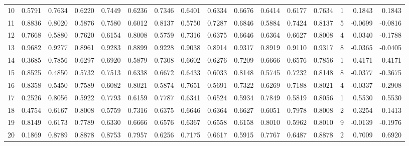 \begin{tabular}{lrrrrrrrrrrrrrrr}
10  &      0.5791 &  0.7634 &  0.6220 &  0.7449 &  0.6236 &  0.7346 &  0.6401 &  0.6334 &  0.6676 &  0.6414 &   0.6177 &     0.7634 &      1 &                    0.1843 &                     0.1843 \\
11  &      0.8836 &  0.8020 &  0.5876 &  0.7580 &  0.6012 &  0.8137 &  0.5750 &  0.7287 &  0.6846 &  0.5884 &   0.7424 &     0.8137 &      5 &                   -0.0699 &                    -0.0816 \\
12  &      0.7668 &  0.5880 &  0.7620 &  0.6154 &  0.8008 &  0.5759 &  0.7316 &  0.6375 &  0.6646 &  0.6364 &   0.6627 &     0.8008 &      4 &                    0.0340 &                    -0.1788 \\
13  &      0.9682 &  0.9277 &  0.8961 &  0.9283 &  0.8899 &  0.9228 &  0.9038 &  0.8914 &  0.9317 &  0.8919 &   0.9110 &     0.9317 &      8 &                   -0.0365 &                    -0.0405 \\
14  &      0.3685 &  0.7856 &  0.6297 &  0.6920 &  0.5879 &  0.7308 &  0.6602 &  0.6276 &  0.7209 &  0.6666 &   0.6576 &     0.7856 &      1 &                    0.4171 &                     0.4171 \\
15  &      0.8525 &  0.4850 &  0.5732 &  0.7513 &  0.6338 &  0.6672 &  0.6433 &  0.6033 &  0.8148 &  0.5745 &   0.7232 &     0.8148 &      8 &                   -0.0377 &                    -0.3675 \\
16  &      0.8358 &  0.5450 &  0.7589 &  0.6082 &  0.8021 &  0.5874 &  0.7651 &  0.5691 &  0.7322 &  0.6269 &   0.7188 &     0.8021 &      4 &                   -0.0337 &                    -0.2908 \\
17  &      0.2526 &  0.8056 &  0.5922 &  0.7793 &  0.6159 &  0.7787 &  0.6341 &  0.6524 &  0.5934 &  0.7849 &   0.5819 &     0.8056 &      1 &                    0.5530 &                     0.5530 \\
18  &      0.4754 &  0.6167 &  0.8008 &  0.5759 &  0.7316 &  0.6375 &  0.6646 &  0.6364 &  0.6627 &  0.6051 &   0.7978 &     0.8008 &      2 &                    0.3254 &                     0.1413 \\
19  &      0.8149 &  0.6173 &  0.7789 &  0.6330 &  0.6666 &  0.6576 &  0.6367 &  0.6558 &  0.6158 &  0.8010 &   0.5962 &     0.8010 &      9 &                   -0.0139 &                    -0.1976 \\
20  &      0.1869 &  0.8789 &  0.8878 &  0.8753 &  0.7957 &  0.6256 &  0.7175 &  0.6617 &  0.5915 &  0.7767 &   0.6487 &     0.8878 &      2 &                    0.7009 &                     0.6920 \\

\end{tabular}
